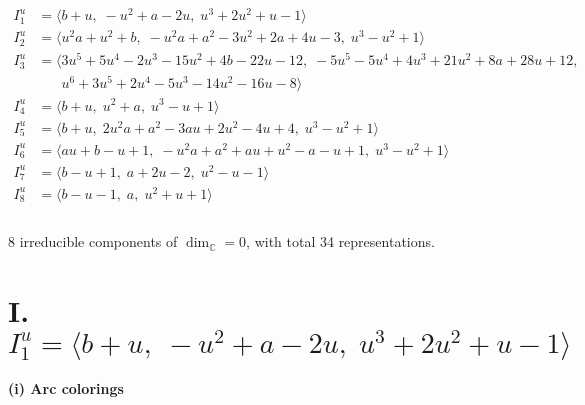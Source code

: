 \documentclass[1p]{elsarticle_modified}
\theoremstyle{definition}
\begin{document}
\begin{align*}
I^u_{1}&=\langle 
b+u,\;- u^2+a-2 u,\;u^3+2 u^2+u-1\rangle \\
I^u_{2}&=\langle 
u^2 a+u^2+b,\;- u^2 a+a^2-3 u^2+2 a+4 u-3,\;u^3- u^2+1\rangle \\
I^u_{3}&=\langle 
3 u^5+5 u^4-2 u^3-15 u^2+4 b-22 u-12,\;-5 u^5-5 u^4+4 u^3+21 u^2+8 a+28 u+12,\\
\phantom{I^u_{3}}&\phantom{= \langle  }u^6+3 u^5+2 u^4-5 u^3-14 u^2-16 u-8\rangle \\
I^u_{4}&=\langle 
b+u,\;u^2+a,\;u^3- u+1\rangle \\
I^u_{5}&=\langle 
b+u,\;2 u^2 a+a^2-3 a u+2 u^2-4 u+4,\;u^3- u^2+1\rangle \\
I^u_{6}&=\langle 
a u+b- u+1,\;- u^2 a+a^2+a u+u^2- a- u+1,\;u^3- u^2+1\rangle \\
I^u_{7}&=\langle 
b- u+1,\;a+2 u-2,\;u^2- u-1\rangle \\
I^u_{8}&=\langle 
b- u-1,\;a,\;u^2+u+1\rangle \\
\\
\end{align*}
\raggedright * 8 irreducible components of $\dim_{\mathbb{C}}=0$, with total 34 representations.\\
\newpage
\renewcommand{\arraystretch}{1}
\centering \section*{I. $I^u_{1}= \langle b+u,\;- u^2+a-2 u,\;u^3+2 u^2+u-1 \rangle$}
\flushleft \textbf{(i) Arc colorings}\\
\end{document}
